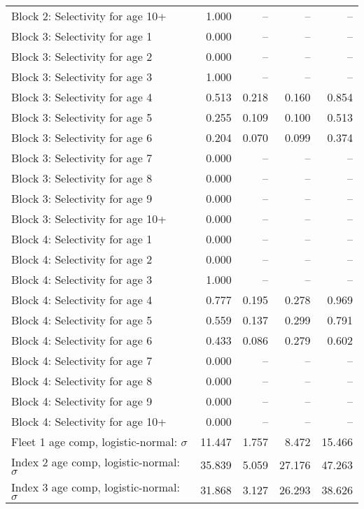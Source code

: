 \documentclass[
]{article}
\begin{document}
\begin{landscape}
\begin{longtable}[t]{lrrrr}
Block 2: Selectivity for age 10+ & 1.000 & -- & -- & --\\
Block 3: Selectivity for age 1 & 0.000 & -- & -- & --\\
Block 3: Selectivity for age 2 & 0.000 & -- & -- & --\\
Block 3: Selectivity for age 3 & 1.000 & -- & -- & --\\
\addlinespace
Block 3: Selectivity for age 4 & 0.513 & 0.218 & 0.160 & 0.854\\
Block 3: Selectivity for age 5 & 0.255 & 0.109 & 0.100 & 0.513\\
Block 3: Selectivity for age 6 & 0.204 & 0.070 & 0.099 & 0.374\\
Block 3: Selectivity for age 7 & 0.000 & -- & -- & --\\
Block 3: Selectivity for age 8 & 0.000 & -- & -- & --\\
\addlinespace
Block 3: Selectivity for age 9 & 0.000 & -- & -- & --\\
Block 3: Selectivity for age 10+ & 0.000 & -- & -- & --\\
Block 4: Selectivity for age 1 & 0.000 & -- & -- & --\\
Block 4: Selectivity for age 2 & 0.000 & -- & -- & --\\
Block 4: Selectivity for age 3 & 1.000 & -- & -- & --\\
\addlinespace
Block 4: Selectivity for age 4 & 0.777 & 0.195 & 0.278 & 0.969\\
Block 4: Selectivity for age 5 & 0.559 & 0.137 & 0.299 & 0.791\\
Block 4: Selectivity for age 6 & 0.433 & 0.086 & 0.279 & 0.602\\
Block 4: Selectivity for age 7 & 0.000 & -- & -- & --\\
Block 4: Selectivity for age 8 & 0.000 & -- & -- & --\\
\addlinespace
Block 4: Selectivity for age 9 & 0.000 & -- & -- & --\\
Block 4: Selectivity for age 10+ & 0.000 & -- & -- & --\\
Fleet 1 age comp, logistic-normal: $\sigma$ & 11.447 & 1.757 & 8.472 & 15.466\\
Index 2 age comp, logistic-normal: $\sigma$ & 35.839 & 5.059 & 27.176 & 47.263\\
Index 3 age comp, logistic-normal: $\sigma$ & 31.868 & 3.127 & 26.293 & 38.626\\*
\end{longtable}
\end{landscape}
\end{document}
